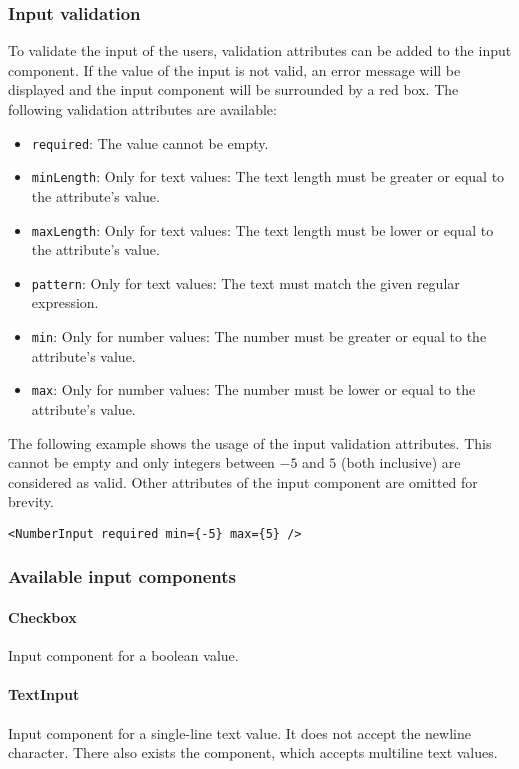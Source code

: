 \subsubsection*{Input validation}
To validate the input of the users, validation attributes can be added to the input component. 
If the value of the input is not valid, an error message will be displayed and the input component will be surrounded by a red box. 
The following validation attributes are available:
\begin{itemize}
  \item \texttt{required}: The value cannot be empty.
  \item \texttt{minLength}: Only for text values: The text length must be greater or equal to the attribute's value.
  \item \texttt{maxLength}: Only for text values: The text length must be lower or equal to the attribute's value.
  \item \texttt{pattern}: Only for text values: The text must match the given regular expression.
  \item \texttt{min}: Only for number values: The number must be greater or equal to the attribute's value.
  \item \texttt{max}: Only for number values: The number must be lower or equal to the attribute's value.
\end{itemize}

The following example shows the usage of the input validation attributes. 
This  cannot be empty and only integers between $-5$ and $5$ (both inclusive) are considered as valid.
Other attributes of the input component are omitted for brevity.
\begin{verbatim}
<NumberInput required min={-5} max={5} />
\end{verbatim}

\subsubsection*{Available input components}
\paragraph{Checkbox}
\label{sec:component-checkbox}
Input component for a boolean value.

\paragraph{TextInput}
\label{sec:component-text-input}
Input component for a single-line text value. 
It does not accept the newline character. 
There also exists the  component, which accepts multiline text values.

